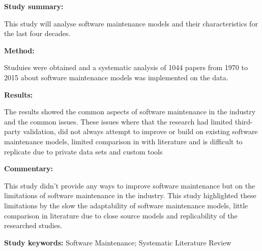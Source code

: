 \begin{tcolorbox}[colback=gray!5!white, colframe=pastelgreen!40!black, title=Analyzing Forty Years of Software Maintenance Models\cite{Lenarduzzi2017}]
	\begin{minipage}[t]{0.25\textwidth}
		\textbf{Study summary:}
	\end{minipage}
	\hfill
	\begin{minipage}[t]{0.65\textwidth}
		This study will analyse software maintenance models and their characteristics for the last
		four decades.
	\end{minipage}

	\vspace{0.75em} 

	\begin{minipage}[t]{0.25\textwidth}
		\textbf{Method:}
	\end{minipage}
	\hfill
	\begin{minipage}[t]{0.65\textwidth}
		Studuies were obtained and a systematic analysis of 1044 papers from 1970 to 2015 about software maintenance models was implemented on the data.
	\end{minipage}

	\vspace{0.75em} 

	\begin{minipage}[t]{0.25\textwidth}
		\textbf{Results:}
	\end{minipage}
	\hfill
	\begin{minipage}[t]{0.65\textwidth}
		The results showed the common aspects of software maintenance in the industry and the common issues. These issues where that the research had limited third-party validation, did not always attempt to improve or build on existing software maintenance models, limited comparison in with literature and is difficult to replicate due to private data sets and custom tools
	\end{minipage}

	\vspace{0.75em} 

	\begin{minipage}[t]{0.25\textwidth}
		\textbf{Commentary:}
	\end{minipage}
	\hfill
	\begin{minipage}[t]{0.65\textwidth}
		This study didn't provide any ways to improve software maintenance but on the limitations of
		software maintenance in the industry. This study highlighted these limitations by the slow
		the adaptability of software maintenance models, little comparison in literature due to close
		source models and replicability of the researched studies.
	\end{minipage}
	\tcblower
	\textbf{Study keywords:} Software Maintenance; Systematic Literature Review
\end{tcolorbox}

